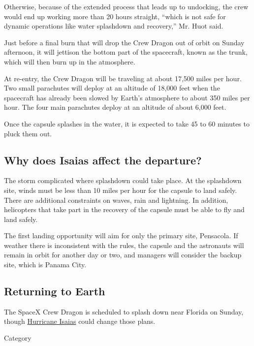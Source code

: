Otherwise, because of the extended process that leads up to undocking,
the crew would end up working more than 20 hours straight, ``which is
not safe for dynamic operations like water splashdown and recovery,''
Mr. Huot said.

Just before a final burn that will drop the Crew Dragon out of orbit on
Sunday afternoon, it will jettison the bottom part of the spacecraft,
known as the trunk, which will then burn up in the atmosphere.

At re-entry, the Crew Dragon will be traveling at about 17,500 miles per
hour. Two small parachutes will deploy at an altitude of 18,000 feet
when the spacecraft has already been slowed by Earth's atmosphere to
about 350 miles per hour. The four main parachutes deploy at an altitude
of about 6,000 feet.

Once the capsule splashes in the water, it is expected to take 45 to 60
minutes to pluck them out.

\hypertarget{why-does-isaias-affect-the-departure}{%
\subsection{Why does Isaias affect the
departure?}\label{why-does-isaias-affect-the-departure}}

The storm complicated where splashdown could take place. At the
splashdown site, winds must be less than 10 miles per hour for the
capsule to land safely. There are additional constraints on waves, rain
and lightning. In addition, helicopters that take part in the recovery
of the capsule must be able to fly and land safely.

The first landing opportunity will aim for only the primary site,
Pensacola. If weather there is inconsistent with the rules, the capsule
and the astronauts will remain in orbit for another day or two, and
managers will consider the backup site, which is Panama City.

\hypertarget{returning-to-earth}{%
\subsection{Returning to Earth}\label{returning-to-earth}}

The SpaceX Crew Dragon is scheduled to splash down near Florida on
Sunday, though
\href{https://www.nytimes.com/interactive/2020/07/31/us/hurricane-isaias-tracker-map.html}{Hurricane
Isaias} could change those plans.

Category


